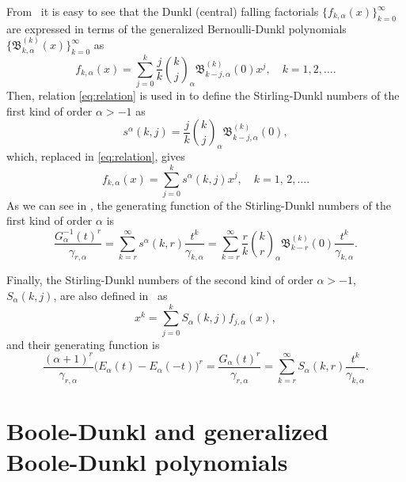 \documentclass[11pt]{article}
\theoremstyle{plain}
\theoremstyle{remark}
\numberwithin{equation}{section} %
\newcommand{\Ea}{E_{\alpha}}
\newcommand{\binoma}[2]{\binom{#1}{#2}_{\!\alpha}}
\newcommand{\B}{\mathfrak{B}}
\begin{document}
From~\cite[Theorem 5.1]{ELMV} it is easy to see that the Dunkl (central) falling factorials $\{f_{k,\alpha}(x)\}_{k=0}^{\infty}$ are expressed in terms of the generalized Bernoulli-Dunkl polynomials $\{\B_{k,\alpha}^{(k)}(x)\}_{k=0}^{\infty}$ as 
\begin{equation}
\label{eq:relation}
  f_{k,\alpha}(x) =\sum_{j=0}^k \frac{j}{k}\binoma{k}{j} \B_{k-j,\alpha}^{(k)}(0)x^j,
  \quad k = 1,2,\ldots.
\end{equation}
Then, relation \eqref{eq:relation} is used in \cite{MV2} to define the Stirling-Dunkl numbers of the first kind of order $\alpha>-1$ as
\begin{equation}
\label{eq:saB}
  s^{\alpha}(k,j) = \frac{j}{k}\binoma{k}{j}\B_{k-j,\alpha}^{(k)}(0),
\end{equation}
which, replaced in \eqref{eq:relation}, gives
\[
  f_{k,\alpha}(x) = \sum_{j=0}^k s^{\alpha}(k,j)x^j,\quad k=1,\,2,\ldots.
\]
As we can see in \cite[Theorem~3.4]{MV2}, the generating function of the Stirling-Dunkl numbers of the first kind of order $\alpha$ is
\begin{equation}
\label{eq:stirling}
  \frac{G^{-1}_{\alpha}(t)^r}{\gamma_{r,\alpha}}
  = \sum_{k=r}^{\infty} s^{\alpha}(k,r) \frac{t^k}{\gamma_{k,\alpha}}
  = \sum_{k=r}^{\infty} \frac{r}{k} \binoma{k}{r} \B_{k-r}^{(k)}(0) \frac{t^k}{\gamma_{k,\alpha}}.
\end{equation}

Finally, the Stirling-Dunkl numbers of the second kind of order $\alpha>-1$, $S_{\alpha}(k,j)$, are also defined  in~\cite{MV2} as
\[
  x^k = \sum_{j=0}^{k}S_{\alpha}(k,j)f_{j,\alpha}(x),
\]
and their generating function is
\begin{equation}
\label{eq:Stir-2}
  \frac{(\alpha+1)^r}{\gamma_{r,\alpha}}\big(\Ea(t)-\Ea(-t)\big)^r
  = \frac{G_\alpha(t)^r}{\gamma_{r,\alpha}} 
  = \sum_{k=r}^{\infty} S_\alpha(k,r) \frac{t^k}{\gamma_{k,\alpha}}.
\end{equation}

\section{Boole-Dunkl and generalized Boole-Dunkl polynomials}
\label{sec:BooleDunkl}
\end{document}
